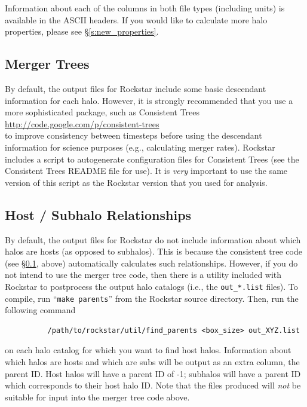 \documentclass[12pt]{article}
\begin{document}
Information about each of the columns in both file types (including units) is available in the ASCII headers.  If you would like to calculate more halo properties, please see \S \ref{s:new_properties}.

\subsection{Merger Trees}
	\label{s:merger_trees}
      By default, the output files for Rockstar include some basic descendant
      information for each halo.  However, it is strongly recommended that
      you use a more sophisticated package, such as Consistent Trees\\[1ex]
      \url{http://code.google.com/p/consistent-trees}\\[1ex] 
      to improve consistency
      between timesteps before using the descendant information for science
      purposes (e.g., calculating merger rates).  Rockstar includes a script
      to autogenerate configuration files for Consistent Trees (see the
      Consistent Trees README file for use).  It is \textit{very} important to use the
      same version of this script as the Rockstar version that you used for analysis.

\subsection{Host / Subhalo Relationships}
      By default, the output files for Rockstar do not include information
      about which halos are hosts (as opposed to subhalos).  This is because
      the consistent tree code (see \S \ref{s:merger_trees}, above) automatically
      calculates such relationships.  However, if you do not intend to use the
      merger tree code, then there is a utility included with Rockstar to
      postprocess the output halo catalogs (i.e., the \texttt{out\_*.list} files).  To
      compile, run ``\texttt{make parents}'' from the Rockstar source directory.  Then,
      run the following command
\begin{verbatim}
      	  /path/to/rockstar/util/find_parents <box_size> out_XYZ.list
\end{verbatim}
      on each halo catalog for which you want to find host halos.  Information
      about which halos are hosts and which are subs will be output as an
      extra column, the parent ID.  Host halos will have a parent ID of -1;
      subhalos will have a parent ID which corresponds to their host halo ID.
      Note that the files produced will \textit{not} be suitable for input into the
      merger tree code above.
\end{document}
